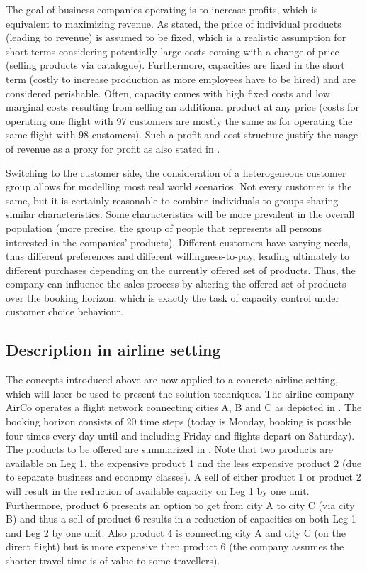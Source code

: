 The goal of business companies operating is to increase profits, which is equivalent to maximizing revenue. As stated, the price of individual products (leading to revenue) is assumed to be fixed, which is a realistic assumption for short terms considering potentially large costs coming with a change of price (\eg selling products via catalogue). Furthermore, capacities are fixed in the short term (costly to increase production as \eg more employees have to be hired) and are considered perishable. Often, capacity comes with high fixed costs and low marginal costs resulting from selling an additional product at any price (\eg costs for operating one flight with 97 customers are mostly the same as for operating the same flight with 98 customers). Such a profit and cost structure justify the usage of revenue as a proxy for profit as also stated in \cite{Strauss.2018}.

Switching to the customer side, the consideration of a heterogeneous customer group allows for modelling most real world scenarios. Not every customer is the same, but it is certainly reasonable to combine individuals to groups sharing similar characteristics. Some characteristics will be more prevalent in the overall population (more precise, the group of people that represents all persons interested in the companies' products).  Different customers have varying needs, thus different preferences and different willingness-to-pay, leading ultimately to different purchases depending on the currently offered set of products. Thus, the company can influence the sales process by altering the offered set of products over the booking horizon, which is exactly the task of capacity control under customer choice behaviour.

\subsection{Description in airline setting}\label{ss:Prob:AirDesc}

The concepts introduced above are now applied to a concrete airline setting, which will later be used to present the solution techniques. The airline company AirCo operates a flight network connecting cities A, B and C as depicted in . The booking horizon consists of 20 time steps (\eg today is Monday, booking is possible four times every day until and including Friday and flights depart on Saturday). The products to be offered are summarized in . Note that two products are available on Leg 1, \ie the expensive product 1 and the less expensive product 2 (\eg due to separate business and economy classes). A sell of either product 1 or product 2 will result in the reduction of available capacity on Leg 1 by one unit. Furthermore, product 6 presents an option to get from city A to city C (via city B) and thus a sell of product 6 results in a reduction of capacities on both Leg 1 and Leg 2 by one unit. Also product 4 is connecting city A and city C (on the direct flight) but is more expensive then product 6 (\eg the company assumes the shorter travel time is of value to some travellers). 

